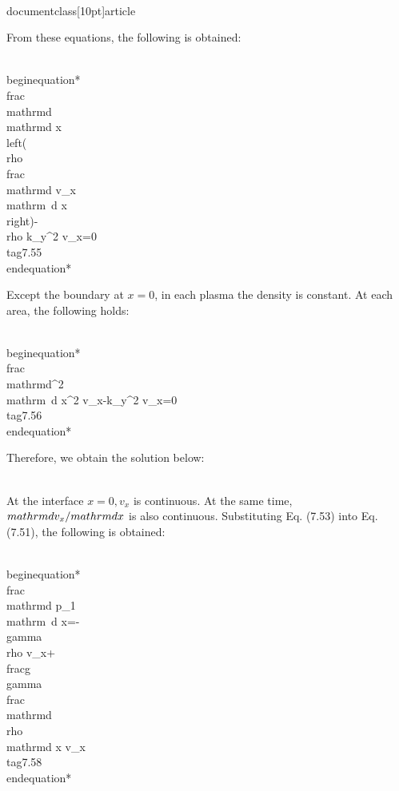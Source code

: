 \\documentclass[10pt]{article}
\begin{document}
{{{{From these equations, the following is obtained:


\\begin{equation*}
\\frac{\\mathrm{d}}{\\mathrm{d} x}\\left(\\rho \\frac{\\mathrm{d} v_{x}}{\\mathrm{~d} x}\\right)-\\rho k_{y}^{2} v_{x}=0 \\tag{7.55}
\\end{equation*}


Except the boundary at $x=0$, in each plasma the density is constant. At each area, the following holds:


\\begin{equation*}
\\frac{\\mathrm{d}^{2}}{\\mathrm{~d} x^{2}} v_{x}-k_{y}^{2} v_{x}=0 \\tag{7.56}
\\end{equation*}


Therefore, we obtain the solution below:

\\[
v_{x}= \\begin{cases}A \\exp \\left(+k_{y} x\\right) & \\text { for } x<0  \\tag{7.57}\\\\ A \\exp \\left(-k_{y} x\\right) & \\text { for } x>0\\end{cases}
\\]

At the interface $x=0, v_{x}$ is continuous. At the same time, $\\mathrm{d} v_{x} / \\mathrm{d} x$ is also continuous. Substituting Eq. (7.53) into Eq. (7.51), the following is obtained:


\\begin{equation*}
\\frac{\\mathrm{d} p_{1}}{\\mathrm{~d} x}=-\\gamma \\rho v_{x}+\\frac{g}{\\gamma} \\frac{\\mathrm{d} \\rho}{\\mathrm{d} x} v_{x} \\tag{7.58}
\\end{equation*}


}}}}
\end{document}
